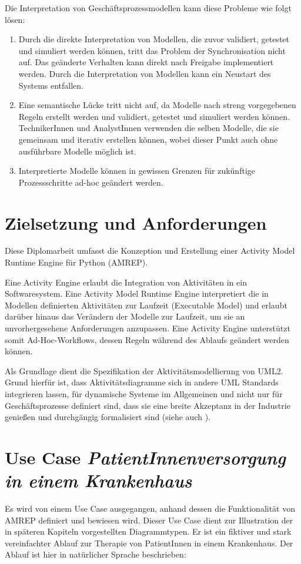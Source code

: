 Die Interpretation von Geschäftsprozessmodellen kann diese Probleme wie folgt lösen:
\begin{enumerate}
\item Durch die direkte Interpretation von Modellen, die zuvor validiert, getestet und simuliert werden können, tritt das Problem der Synchronisation nicht auf. Das geänderte Verhalten kann direkt nach Freigabe implementiert werden. Durch die Interpretation von Modellen kann ein Neustart des Systems entfallen.
\item Eine semantische Lücke tritt nicht auf, da Modelle nach streng vorgegebenen Regeln erstellt werden und validiert, getestet und simuliert werden können. TechnikerInnen und AnalystInnen verwenden die selben Modelle, die sie gemeinsam und iterativ erstellen können, wobei dieser Punkt auch ohne ausführbare Modelle möglich ist.
\item Interpretierte Modelle können in gewissen Grenzen für zukünftige Prozessschritte ad-hoc geändert werden.
\end{enumerate}


\section{Zielsetzung und Anforderungen}

Diese Diplomarbeit umfasst die Konzeption und Erstellung einer Activity Model Runtime Engine für Python (AMREP).

Eine Activity Engine erlaubt die Integration von Aktivitäten in ein Softwaresystem. Eine Activity Model Runtime Engine interpretiert die in Modellen definierten Aktivitäten zur Laufzeit (Executable Model) und erlaubt darüber hinaus das Verändern der Modelle zur Laufzeit, um sie an unvorhergesehene Anforderungen anzupassen. Eine Activity Engine unterstützt somit Ad-Hoc-Workflows, dessen Regeln während des Ablaufs geändert werden können.

Als Grundlage dient die Spezifikation der Aktivitätsmodellierung von UML2. Grund hierfür ist, dass Aktivitätsdiagramme sich in andere UML Standards integrieren lassen, für dynamische Systeme im Allgemeinen und nicht nur für Geschäftsprozesse definiert sind, dass sie eine breite Akzeptanz in der Industrie genießen und durchgängig formalisiert sind (siehe auch ).


\section{Use Case \emph{PatientInnenversorgung in einem Krankenhaus}}\label{intro-usecase}
Es wird von einem Use Case ausgegangen, anhand dessen die Funktionalität von AMREP definiert und bewiesen wird. Dieser Use Case dient zur Illustration der in späteren Kapiteln vorgestellten Diagrammtypen. Er ist ein fiktiver und stark vereinfachter Ablauf zur Therapie von PatientInnen in einem Krankenhaus. Der Ablauf ist hier in natürlicher Sprache beschrieben:

